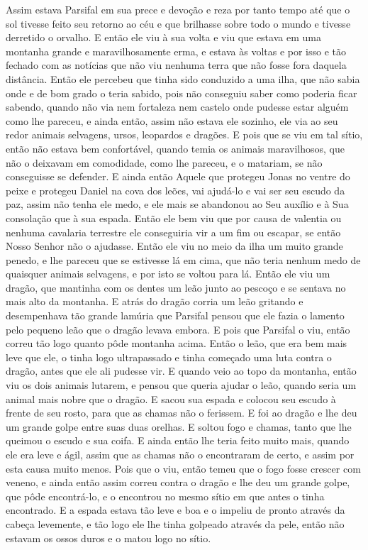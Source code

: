 Assim estava Parsifal em sua prece e devoção e reza por tanto tempo até que
o sol tivesse feito seu retorno ao céu e que brilhasse sobre todo o mundo e
tivesse derretido o orvalho. E então ele viu à sua volta e viu que estava em
uma montanha grande e maravilhosamente erma, e estava às voltas e por isso e
tão fechado com as notícias que não viu nenhuma terra que não fosse fora
daquela distância. Então ele percebeu que tinha sido conduzido a uma ilha, que
não sabia onde e de bom grado o teria sabido, pois não conseguiu saber como
poderia ficar sabendo, quando não via nem fortaleza nem castelo onde pudesse
estar alguém como lhe pareceu, e ainda então, assim não estava ele sozinho, ele
via ao seu redor animais selvagens, ursos, leopardos e dragões. E pois que se
viu em tal sítio, então não estava bem confortável, quando temia os animais
maravilhosos, que não o deixavam em comodidade, como lhe pareceu, e o matariam,
se não conseguisse se defender. E ainda então Aquele que protegeu Jonas no
ventre do peixe e protegeu Daniel na cova dos leões, vai ajudá-lo e vai ser seu
escudo da paz, assim não tenha ele medo, e ele mais se abandonou ao Seu auxílio
e à Sua consolação que à sua espada. Então ele bem viu que por causa de
valentia ou nenhuma cavalaria terrestre ele conseguiria vir a um fim ou
escapar, se então Nosso Senhor não o ajudasse. Então ele viu no meio da ilha um
muito grande penedo, e lhe pareceu que se estivesse lá em cima, que não teria
nenhum medo de quaisquer animais selvagens, e por isto se voltou para lá. Então
ele viu um dragão, que mantinha com os dentes um leão junto ao pescoço e se
sentava no mais alto da montanha. E atrás do dragão corria um leão gritando e
desempenhava tão grande lamúria que Parsifal pensou que ele fazia o lamento
pelo pequeno leão que o dragão levava embora. E pois que Parsifal o viu, então
correu tão logo quanto pôde montanha acima. Então o leão, que era bem mais leve
que ele, o tinha logo ultrapassado e tinha começado uma luta contra o dragão, antes
que ele ali pudesse vir. E quando veio ao topo da montanha, então viu os dois
animais lutarem, e pensou que queria ajudar o leão, quando seria um animal mais
nobre que o dragão. E sacou sua espada e colocou seu escudo à frente de seu
rosto, para que as chamas não o ferissem. E foi ao dragão e lhe deu um grande
golpe entre suas duas orelhas. E soltou fogo e chamas, tanto que lhe queimou o
escudo e sua coifa. E ainda então lhe teria feito muito mais, quando ele era
leve e ágil, assim que as chamas não o encontraram de certo, e assim por esta
causa muito menos. Pois que o viu, então temeu que o fogo fosse crescer com
veneno, e ainda então assim correu contra o dragão e lhe deu um grande golpe,
que pôde encontrá-lo, e o encontrou no mesmo sítio em que antes o tinha
encontrado. E a espada estava tão leve e boa e o impeliu de pronto através da
cabeça levemente, e tão logo ele lhe tinha golpeado através da pele, então não
estavam os ossos duros e o matou logo no sítio. 

